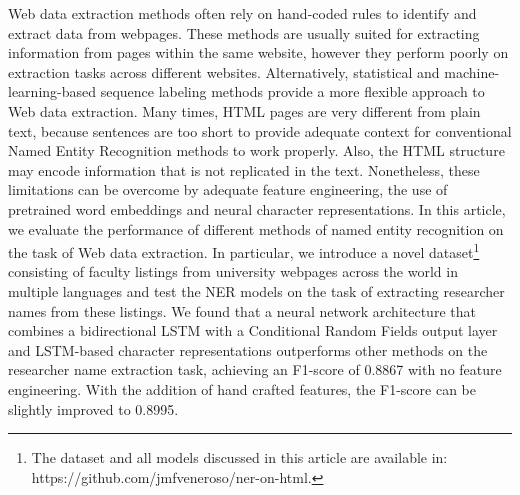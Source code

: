 Web data extraction methods often rely on hand-coded rules to 
identify and extract data from webpages. These methods are usually
suited for extracting information from pages within
the same website, however they perform poorly on extraction 
tasks across different websites. Alternatively, statistical and 
machine-learning-based sequence labeling methods provide a more flexible 
approach to Web data extraction. Many times, HTML pages are very different 
from plain text, because sentences are too short to provide adequate 
context for conventional Named Entity Recognition methods to work 
properly. Also, the HTML structure may encode information that is not 
replicated in the text. Nonetheless, these limitations can be overcome by
adequate feature engineering, the use of pretrained word 
embeddings and neural character representations. In this article, we 
evaluate the performance of different methods of named entity recognition 
on the task of Web data extraction. In particular, we introduce a novel 
dataset\footnote{The dataset and all models discussed in this article are 
available in: https://github.com/jmfveneroso/ner-on-html.} 
consisting of faculty listings from university webpages across
the world in multiple languages and test the NER models on the task of 
extracting researcher names from these listings. We found that a 
neural network architecture that combines a bidirectional LSTM with
a Conditional Random Fields output layer and LSTM-based character 
representations outperforms other methods on the researcher name 
extraction task, achieving an F1-score of 0.8867 with no feature engineering. 
With the addition of hand crafted features, the F1-score can be slightly 
improved to 0.8995.

